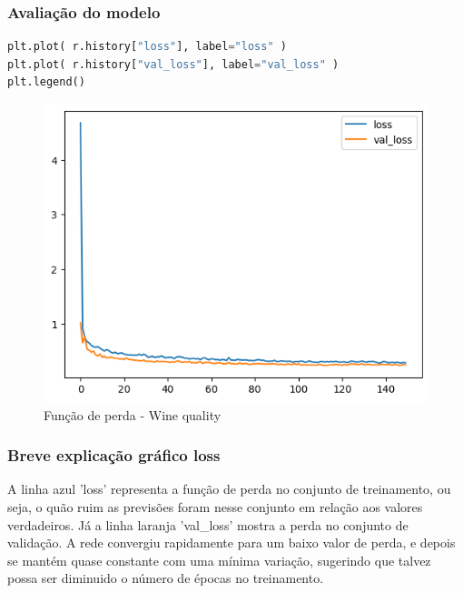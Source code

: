 \subsubsection*{Avaliação do modelo}
\begin{lstlisting}[language=Python, style=input]
plt.plot( r.history["loss"], label="loss" )
plt.plot( r.history["val_loss"], label="val_loss" )
plt.legend()
\end{lstlisting}
\begin{figure}[H]
\centering
\includegraphics[width=.8\linewidth]{apendices/fig/13_IAA012_6.png}
\caption{Função de perda - Wine quality}
\end{figure}
\subsubsection*{Breve explicação gráfico loss}
A linha azul 'loss' representa a função de perda no conjunto de treinamento, ou seja, o quão ruim as previsões foram nesse conjunto em relação aos valores verdadeiros. Já a linha laranja 'val\_loss' mostra a perda no conjunto de validação. A rede convergiu rapidamente para um baixo valor de perda, e depois se mantém quase constante com uma mínima variação, sugerindo que talvez possa ser diminuido o número de épocas no treinamento.

